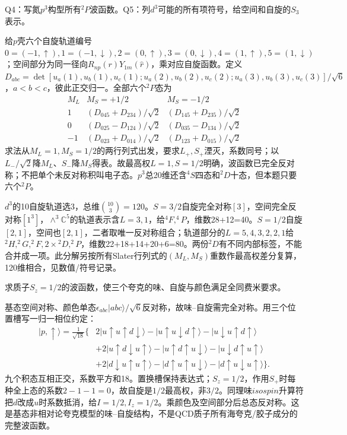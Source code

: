 \begin{exercise}
Q4：写氮$p^3$构型所有$^2P$波函数。Q5：列$d^3$可能的所有项符号，给空间和自旋的$S_3$表示。
\end{exercise}
\begin{solution}
给$p$壳六个自旋轨道编号$0=(-1,\uparrow),1=(-1,\downarrow),2=(0,\uparrow),3=(0,\downarrow),4=(1,\uparrow),5=(1,\downarrow)$；空间部分为同一径向$R_{np}(r)Y_{1m}(\hat r)$，乘对应自旋函数。定义$D_{abc}=\det[u_a(1),u_b(1),u_c(1);u_a(2),u_b(2),u_c(2);u_a(3),u_b(3),u_c(3)]/\sqrt6$，$a<b<c$，彼此正交归一。全部六个$^2P$态为
\[
\begin{array}{c|cc}
 M_L & M_S=+1/2 & M_S=-1/2\\\hline
 1 &(D_{045}+D_{234})/\sqrt2 &(D_{145}+D_{235})/\sqrt2\\
 0 &(D_{025}-D_{124})/\sqrt2 &(D_{035}-D_{134})/\sqrt2\\
 -1 &(D_{023}+D_{014})/\sqrt2 &(D_{123}+D_{015})/\sqrt2
\end{array}
\]
求法从$M_L=1,M_S=1/2$的两行列式出发，要求$L_+,S_+$湮灭，系数同号；以$L_-/\sqrt2$降$M_L$、$S_-$降$M_S$得表。故最高权$L=1,S=1/2$明确，波函数已完全反对称；不把单个未反对称积叫电子态。$p^3$总20维还含$^4S$四态和$^2D$十态，但本题只要六个$^2P$。

$d^3$的10自旋轨道选3，总维$\binom{10}3=120$。$S=3/2$自旋完全对称$[3]$，空间完全反对称$[1^3]$，$\wedge^3\mathbb C^5$的轨道表示含$L=3,1$，给$^4F,^4P$，维数28+12=40。$S=1/2$自旋$[2,1]$，空间也$[2,1]$，二者取唯一反对称组合；轨道部分的$L=5,4,3,2,2,1$给$^2H,^2G,^2F,2\times{}^2D,^2P$，维数22+18+14+20+6=80。两份$^2D$有不同内部标签，不能合并成一项。此分解另按所有Slater行列式的$(M_L,M_S)$重数作最高权差分复算，120维相合，见数值/符号记录。
\end{solution}

\begin{exercise}
求质子$S_z=1/2$的波函数，使三个夸克的味、自旋与颜色满足全同费米要求。
\end{exercise}
\begin{solution}
基态空间对称、颜色单态$\epsilon_{abc}|abc\rangle/\sqrt6$反对称，故味--自旋需完全对称。用三个位置槽写一归一相位约定：
\[
\begin{aligned}
 |p,\uparrow\rangle=\frac1{\sqrt{18}}\{&2|u\uparrow u\uparrow d\downarrow\rangle
 -|u\uparrow u\downarrow d\uparrow\rangle-|u\downarrow u\uparrow d\uparrow\rangle\\
 &+2|u\uparrow d\downarrow u\uparrow\rangle
 -|u\uparrow d\uparrow u\downarrow\rangle-|u\downarrow d\uparrow u\uparrow\rangle\\
 &+2|d\downarrow u\uparrow u\uparrow\rangle
 -|d\uparrow u\uparrow u\downarrow\rangle-|d\uparrow u\downarrow u\uparrow\rangle\}.
\end{aligned}
\]
九个积态互相正交，系数平方和18。置换槽保持表达式；$S_z=1/2$，作用$S_+$时每种全上态的系数$2-1-1=0$，故自旋是$1/2$最高权，非$3/2$。同理味$isospin$升算符把$d$改成$u$时系数抵消，给$I=1/2,I_z=1/2$。乘颜色及空间部分后总态反对称。这是基态非相对论夸克模型的味--自旋结构，不是QCD质子所有海夸克/胶子成分的完整波函数。
\end{solution}

